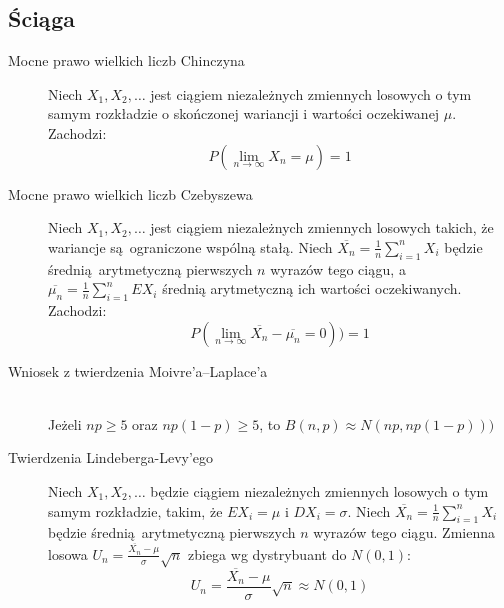 \documentclass[twoside]{mwart}
\begin{document}
\vfill
\subsection*{Ściąga}
\begin{description}
	\item[Mocne prawo wielkich liczb Chinczyna]
	Niech $X_1, X_2, \ldots$ jest ciągiem niezależnych zmiennych losowych o tym samym rozkładzie o skończonej wariancji i wartości oczekiwanej $\mu$. Zachodzi:
	\[ P\left( \lim_{n\to\infty} X_n = \mu \right) = 1 \]
	\item[Mocne prawo wielkich liczb Czebyszewa]
	Niech $X_1, X_2, \ldots$ jest ciągiem niezależnych zmiennych losowych takich, że wariancje są ograniczone wspólną stałą.
	Niech $\overline{X_n}=\frac{1}{n}\sum_{i=1}^{n} X_i$ będzie średnią arytmetyczną pierwszych $n$ wyrazów tego ciągu, a $\overline{\mu_n}=\frac{1}{n}\sum_{i=1}^n EX_i$ średnią arytmetyczną ich wartości oczekiwanych. Zachodzi:
	\[ P\left( \lim_{n\to\infty} \overline{X_n}-\overline{\mu_n} =0 \right)) =1 \]
	\item[Wniosek z twierdzenia Moivre'a--Laplace'a]~\\
	Jeżeli $np\geq 5$ oraz $np(1-p)\geq 5$, to $B(n,p)\approx N(np, np(1-p)))$
	\item[Twierdzenia Lindeberga-Levy'ego]
	Niech $X_1, X_2, \ldots$ będzie ciągiem niezależnych zmiennych losowych o tym samym rozkładzie, takim, że $EX_i=\mu$ i $DX_i=\sigma$.
	Niech $\overline{X_n}=\frac{1}{n}\sum_{i=1}^{n} X_i$ będzie średnią arytmetyczną pierwszych $n$ wyrazów tego ciągu.
	Zmienna losowa $U_n=\frac{\overline{X_n}-\mu}{\sigma}\sqrt{n}$ zbiega wg dystrybuant do $N(0,1)$:
	\[ U_n=\frac{\overline{X_n}-\mu}{\sigma}\sqrt{n} \approx N(0,1) \]
\end{description}

\cleardoublepage
\end{document}
